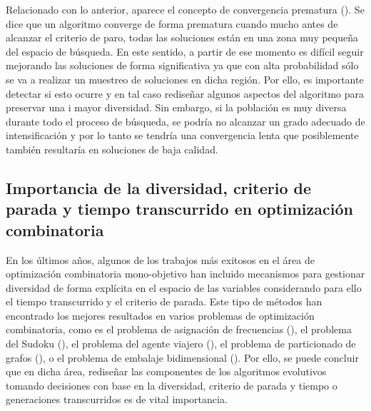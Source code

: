 Relacionado con lo anterior, aparece el concepto de convergencia prematura (\cite{Crepinsek:13}).
%
Se dice que un algoritmo converge de forma prematura cuando mucho antes de alcanzar el criterio de paro, todas las soluciones 
están en una zona muy pequeña del espacio de búsqueda.
%
En este sentido, a partir de ese momento es difícil seguir mejorando las soluciones de forma significativa ya que con alta 
probabilidad sólo se va a realizar un muestreo de soluciones en dicha región.
%
Por ello, es importante detectar si esto ocurre y en tal caso rediseñar algunos aspectos del algoritmo para preservar una i
mayor diversidad.
%
Sin embargo, si la población es muy diversa durante todo el proceso de búsqueda, se podría no alcanzar un grado adecuado de 
intensificación y por lo tanto se tendría una convergencia lenta que posiblemente también resultaría en soluciones de baja calidad.

\subsection{Importancia de la diversidad, criterio de parada y tiempo transcurrido en optimización combinatoria}

En los últimos años, algunos de los trabajos más exitosos en el área de optimización combinatoria mono-objetivo han incluido
mecanismos para gestionar diversidad de forma explícita en el espacio de las variables considerando para ello el tiempo transcurrido 
y el criterio de parada.
%
Este tipo de métodos han encontrado los mejores resultados en varios problemas de optimización combinatoria, como es el problema 
de asignación de frecuencias  (\cite{Joel:Dynamic_FAP}), el problema del Sudoku 
 (\cite{Joel:Dynamic_Sudoku}), el problema del agente viajero 
 (\cite{Joel:ANovelDiversityBasedEAForTheTSP}),
el problema de particionado de grafos  (\cite{romero2018memetic}), 
o el problema de embalaje bidimensional  (\cite{segredo2014memetic}).
%
Por ello, se puede concluir que en dicha área, rediseñar las componentes de los algoritmos evolutivos tomando decisiones con base
en la diversidad, criterio de parada y tiempo o generaciones transcurridos es de vital importancia.
